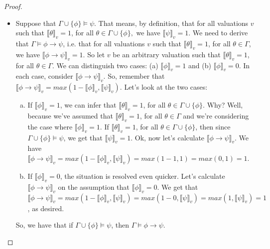 \begin{enumerate}[\thesection.1]
\begin{proof}
\begin{itemize}
				\item Suppose that $\Gamma\cup\{\phi\}\vDash\psi$. That means, by definition, that for all valuations $v$ such that $\llbracket\theta\rrbracket_v=1$, for all $\theta\in \Gamma\cup\{\phi\},$ we have $\llbracket\psi\rrbracket_v=1$. We need to derive that $\Gamma\vDash \phi\to\psi$, i.e. that for all valuations $v$ such that $\llbracket\theta\rrbracket_v=1$, for all $\theta\in \Gamma$, we have $\llbracket\phi\to\psi\rrbracket_v=1$. So let $v$ be an arbitrary valuation such that $\llbracket\theta\rrbracket_v=1$, for all $\theta\in \Gamma$. We can distinguish two cases: (a) $\llbracket \phi\rrbracket_v=1$ and (b) $\llbracket \phi\rrbracket_v=0$. In each case, consider  $\llbracket\phi\to\psi\rrbracket_v$. So, remember that $\llbracket\phi\to\psi\rrbracket_v=max(1-\llbracket\phi\rrbracket_v,\llbracket\psi\rrbracket_v)$. Let's look at the two cases:
				\begin{enumerate}[(a)]
				
					\item If $\llbracket \phi\rrbracket_v=1$, we can infer that $\llbracket\theta\rrbracket_v=1$, for all $\theta\in \Gamma\cup\{\phi\}$. Why? Well, because we've assumed that $\llbracket\theta\rrbracket_v=1$, for all $\theta\in \Gamma$ and we're considering the case where $\llbracket \phi\rrbracket_v=1$. If $\llbracket\theta\rrbracket_v=1$, for all $\theta\in \Gamma\cup\{\phi\}$, then since $\Gamma\cup\{\phi\}\vDash\psi$, we get that $\llbracket\psi\rrbracket_v=1$. Ok, now let's calculate $\llbracket\phi\to\psi\rrbracket_v$. We have $\llbracket\phi\to\psi\rrbracket_v=max(1-\llbracket\phi\rrbracket_v,\llbracket\psi\rrbracket_v)=max(1-1,1)=max(0,1)=1$.
					
					\item If $\llbracket \phi\rrbracket_v=0$, the situation is resolved even quicker. Let's calculate $\llbracket\phi\to\psi\rrbracket_v$ on the assumption that $\llbracket \phi\rrbracket_v=0$. We get that $\llbracket\phi\to\psi\rrbracket_v=max(1-\llbracket\phi\rrbracket_v,\llbracket\psi\rrbracket_v)=max(1-0, \llbracket\psi\rrbracket_v)=max(1, \llbracket\psi\rrbracket_v)=1$, as desired.
					
				\end{enumerate}
			So, we have that if $\Gamma\cup\{\phi\}\vDash\psi$, then $\Gamma\vDash\phi\to\psi$.
				

\end{itemize}
\end{proof}
\end{enumerate}
